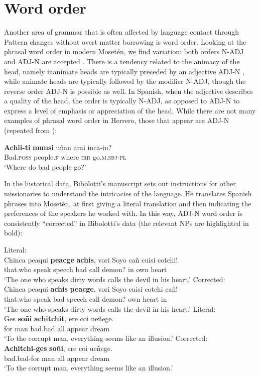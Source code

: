 \documentclass[output=paper,colorlinks,citecolor=brown
]{langscibook}
\begin{document}
\section{Word order}
Another area of grammar that is often affected by language contact through Pattern changes without overt matter borrowing is word order. Looking at the phrasal word order in modern Mosetén, we find variation: both orders N-ADJ and ADJ-N are accepted \citep[103]{sakel2004grammar}. There is a tendency related to the animacy of the head, namely inanimate heads are typically preceded by an adjective ADJ-N , while animate heads are typically followed by the modifier N-ADJ, though the reverse order ADJ-N is possible as well. In Spanish, when the adjective describes a quality of the head, the order is typically N-ADJ, as opposed to ADJ-N to express a level of emphasis or appreciation of the head.
While there are not many examples of phrasal word order in Herrero, those that appear are ADJ-N (repeated from ):

\ea \label{sakel_example_14}
\gll \textbf{Achii-ti} 	\textbf{munsi} 		uñan 	arai  	inca-in?\\
     Bad.\textsc{poss}	people.\textsc{f}	where	\textsc{irr} 	go.\textsc{m.sbj-pl}\\
\glt ‘Where do bad people go?’
\z	

In the historical data, Bibolotti’s manuscript sets out instructions for other missionaries to understand the intricacies of the language. He translates Spanish phrases into Mosetén, at first giving a literal translation and then indicating the preferences of the speakers he worked with. In this way, ADJ-N word order is consistently “corrected” in Bibolotti’s data (the relevant NPs are highlighted in bold): 


\ea \label{sakel_example_15}Literal:\\
\gll Chinca  peaqui  \textbf{peacge}  \textbf{achis},  vori    Soyo    cañ cuisi   cotchi!\\
     that.who   speak    speech  bad	call   demon?    in  own heart\\
\glt ‘The one who speaks dirty words calls the devil in his heart.’
\ex \label{sakel_example_16}Corrected:\\
\gll Chinca  peaqui  \textbf{achis}  \textbf{peacge},  vori    Soyo   cuisi   cotchi  cañ!\\
     that.who   speak    bad    speech	call   demon?  own heart   in\\
\glt ‘The one who speaks dirty words calls the devil in his heart.’
\ex \label{sakel_example_17}Literal:\\
\gll Ges \textbf{soñi} \textbf{achitchit}, ere coi ueñege.\\
     for    man bad.bad all appear  dream\\
\glt ‘To the corrupt man, everything seems like an illusion.’
\ex \label{sakel_example_18}Corrected:\\
\gll \textbf{Achitchi-ges} \textbf{soñi}, ere coi ueñege.\\
     bad.bad-for    man all appear  dream\\
\glt ‘To the corrupt man, everything seems like an illusion.’
\z	
\end{document}
